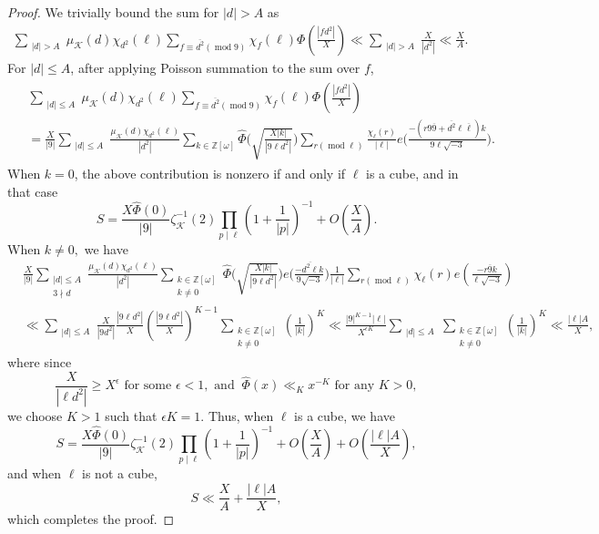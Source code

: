 \documentclass[10pt,a4paper]{amsart}
\newcommand{\mymod}[1]{(\operatorname{mod} #1)}
\begin{document}
\begin{proof}
We trivially bound the sum for $|d|>A$ as
\begin{align*}
    \sum_{\substack{|d|>A}}\mu_\mathcal{K}(d)\chi_{d^2}(\ell)
    \sum_{f \equiv \overline{d^2}\mymod9}\chi_{f}(\ell)\Phi\left(\frac{|fd^2|}{X}\right)
    \ll
    \sum_{\substack{|d|>A}}\frac{X}{|d^2|}
    \ll
    \frac{X}{A}.
\end{align*}
For $|d|\le A$, after applying Poisson summation to the sum over $f$,
\begin{align}
\begin{split}
    &\sum_{\substack{|d|\le A}}\mu_\mathcal{K}(d)\chi_{d^2}(\ell)
    \sum_{f \equiv \overline{d^2}\mymod9}\chi_{f}(\ell)\Phi\left(\frac{|fd^2|}{X}\right)
    \\
    &=
    \frac{X}{|9|}\sum_{\substack{|d|\le A}}\frac{\mu_\mathcal{K}(d)\chi_{d^2}(\ell)}{|d^2|}
    \sum_{k\in \mathbb{Z}[\omega]} \widehat{\Phi}\bigg(\sqrt{\frac{X|k|}{|9{\ell }d^2|}}\bigg)
    \sum_{r\mymod {\ell }} \frac{\chi_{\ell }(r)}{|\ell|}e\bigg(\frac{-( r9\overline{9}+\overline{d^2}\ell\overline{\ell})k}{{9\ell }\sqrt{-3}}\bigg).
\end{split}
\end{align}
When $k=0$, the above contribution is nonzero if and only if $\ell$ is a cube, and in that case
$$S=\frac{X\widehat{\Phi}(0)}{|9|}  \zeta^{-1}_\mathcal{K}(2)  \prod_{p\mid \ell}\left(1+\frac{1}{|p|}\right)^{-1} +O\left(\frac{X}{A}\right).$$
When $k\ne 0,$ we have
\begin{align*}
    &\frac{X}{|9|}\sum_{\substack{|d|\le A\\3\nmid d}}\frac{\mu_\mathcal{K}(d)\chi_{d^2}(\ell)}{|d^2|}
    \sum_{\substack{k\in \mathbb{Z}[\omega]\\k\ne 0}} \widehat{\Phi}\bigg(\sqrt{\frac{X|k|}{|9{\ell }d^2|}}\bigg)
    e\bigg(\frac{- \overline{d^2\ell}k}{{9 }\sqrt{-3}}\bigg)
    \frac{1}{|\ell|}\sum_{r\mymod {\ell }} \chi_{\ell }(r)e\left(\frac{- r\overline{9}k}{{\ell }\sqrt{-3}}\right)\\
    &\ll
    \sum_{\substack{|d|\le A}}\frac{X}{|9d^2|} \frac{|9\ell d^2|}{X} \left(\frac{|9\ell d^2|}{X}\right)^{K-1}
    \sum_{\substack{k\in \mathbb{Z}[\omega]\\k\ne 0}}
    \left(\frac{1}{|k|}\right)^K
    \ll
    \frac{|9|^{K-1}|\ell|}{X^{\epsilon K}}\sum_{\substack{|d|\le A}} 
    \sum_{\substack{k\in \mathbb{Z}[\omega]\\k\ne 0}}
    \left(\frac{1}{|k|}\right)^K\ll
    \frac{|\ell|A}{X},
\end{align*}
where since
$$\frac{X}{|\ell d^2|} \ge X^\epsilon \text{ for some } \epsilon<1, \text{ and } \  \widehat{\Phi}(x)\ll_K x^{-K} \text{ for any } K>0,$$
we choose $K>1$ such that $\epsilon K=1.$
Thus, when $\ell$ is a cube, we have 
$$S=\frac{X\widehat{\Phi}(0)}{|9|}  \zeta^{-1}_\mathcal{K}(2)  \prod_{p\mid \ell}\left(1+\frac{1}{|p|}\right)^{-1} +O\left(\frac{X}{A}\right)+O\left(\frac{|\ell|A}{X}\right),$$
and when $\ell$ is not a cube, 
$$S
\ll
\frac{X}{A}+\frac{|\ell|A}{X},$$
which completes the proof.
\end{proof}
\end{document}
